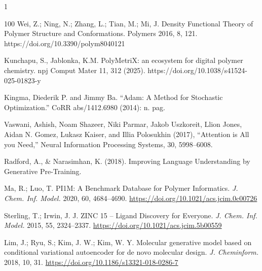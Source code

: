 \begin{spacing}{1}
\begin{thebibliography}{100}
Wei, Z.; Ning, N.; Zhang, L.; Tian, M.; Mi, J. Density Functional Theory of Polymer Structure and Conformations. Polymers 2016, 8, 121. https://doi.org/10.3390/polym8040121 

Kunchapu, S., Jablonka, K.M. PolyMetriX: an ecosystem for digital polymer chemistry. npj Comput Mater 11, 312 (2025). https://doi.org/10.1038/s41524-025-01823-y

Kingma, Diederik P. and Jimmy Ba. “Adam: A Method for Stochastic Optimization.” CoRR abs/1412.6980 (2014): n. pag.

Vaswani, Ashish, Noam Shazeer, Niki Parmar, Jakob Uszkoreit, Llion Jones, Aidan N. Gomez, Lukasz Kaiser, and Illia Polosukhin (2017), “Attention is All you Need,” Neural Information Processing Systems, 30, 5998–6008.

Radford, A., \& Narasimhan, K. (2018). Improving Language Understanding by Generative Pre-Training.

Ma, R.; Luo, T. PI1M: A Benchmark Database for Polymer Informatics. \textit{J. Chem. Inf. Model.} 2020, 60, 4684--4690. \url{https://doi.org/10.1021/acs.jcim.0c00726}

Sterling, T.; Irwin, J. J. ZINC 15 -- Ligand Discovery for Everyone. \textit{J. Chem. Inf. Model.} 2015, 55, 2324--2337. \url{https://doi.org/10.1021/acs.jcim.5b00559}

Lim, J.; Ryu, S.; Kim, J. W.; Kim, W. Y. Molecular generative model based on conditional variational autoencoder for de novo molecular design. \textit{J. Cheminform.} 2018, 10, 31. \url{https://doi.org/10.1186/s13321-018-0286-7}




\end{thebibliography}
\end{spacing}
